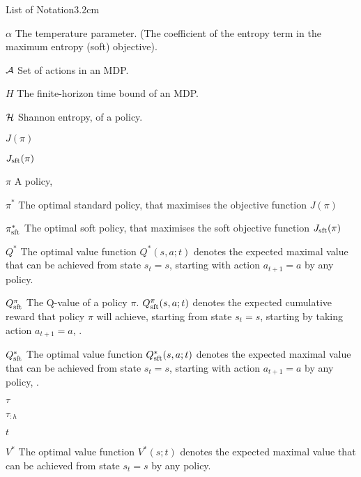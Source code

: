 \begin{mclistof}{List of Notation}{3.2cm}
    \item[$\alpha$] 
        The temperature parameter. (The coefficient of the entropy term in the maximum entropy (soft) objective).
    \item[$\mathcal{A}$] 
        Set of actions in an MDP.
    \item[$H$] 
        The finite-horizon time bound of an MDP. 
    \item[$\mathcal{H}$]
        Shannon entropy, of a policy.
    \item[$J(\pi)$] 
    \item[$J_{{\textnormal{sft}}}(\pi)$] 
    \item[$\pi$]
        A policy, 
    \item[$\pi^*$]
        The optimal standard policy, that maximises the objective function $J(\pi)$
    \item[$\pi_{{\textnormal{sft}}}^*$]
        The optimal soft policy, that maximises the soft objective function $J_{{\textnormal{sft}}}(\pi)$
    \item[$Q^*$]
        The optimal value function $Q^*(s,a;t)$ denotes the expected maximal value that can be achieved from state $s_t=s$, starting with action $a_{t+1}=a$ by any policy.
    \item[$Q_{{\textnormal{sft}}}^{\pi}$]
        The Q-value of a policy $\pi$. $Q_{{\textnormal{sft}}}^{\pi}(s,a;t)$ denotes the expected cumulative reward that policy $\pi$ will achieve, starting from state $s_t=s$, starting by taking action $a_{t+1}=a$, . 
    \item[$Q_{{\textnormal{sft}}}^*$]
        The optimal value function $Q_{{\textnormal{sft}}}^*(s,a;t)$ denotes the expected maximal value that can be achieved from state $s_t=s$, starting with action $a_{t+1}=a$ by any policy, .
    \item[$\tau$] 
    \item[$\tau_{:h}$] 
    \item[$t$] 
    \item[$V^*$]
        The optimal value function $V^*(s;t)$ denotes the expected maximal value that can be achieved from state $s_t=s$ by any policy.

\end{mclistof}
